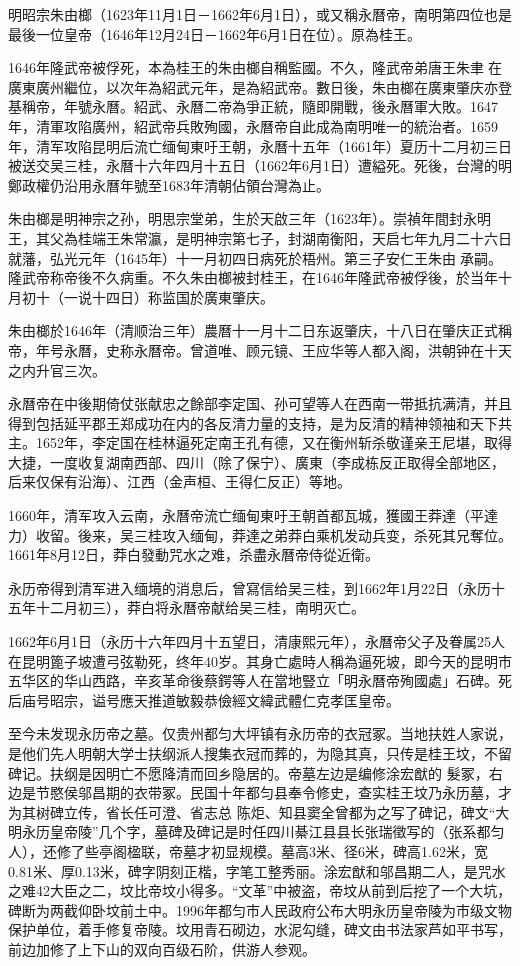 明昭宗朱由榔（1623年11月1日－1662年6月1日），或又稱永曆帝，南明第四位也是最後一位皇帝（1646年12月24日－1662年6月1日在位）。原為桂王。

1646年隆武帝被俘死，本為桂王的朱由榔自稱監國。不久，隆武帝弟唐王朱聿𨮁在廣東廣州繼位，以次年為紹武元年，是為紹武帝。數日後，朱由榔在廣東肇庆亦登基稱帝，年號永曆。紹武、永曆二帝為爭正統，隨即開戰，後永曆軍大敗。1647年，清軍攻陷廣州，紹武帝兵敗殉國，永曆帝自此成為南明唯一的統治者。1659年，清军攻陷昆明后流亡缅甸東吁王朝，永曆十五年（1661年）夏历十二月初三日被送交吴三桂，永曆十六年四月十五日（1662年6月1日）遭縊死。死後，台灣的明鄭政權仍沿用永曆年號至1683年清朝佔領台灣為止。

朱由榔是明神宗之孙，明思宗堂弟，生於天啟三年（1623年）。崇禎年間封永明王，其父為桂端王朱常瀛，是明神宗第七子，封湖南衡阳，天启七年九月二十六日就藩，弘光元年（1645年）十一月初四日病死於梧州。第三子安仁王朱由𣜬承嗣。隆武帝称帝後不久病重。不久朱由榔被封桂王，在1646年隆武帝被俘後，於当年十月初十（一说十四日）称监国於廣東肇庆。

朱由榔於1646年（清顺治三年）農曆十一月十二日东返肇庆，十八日在肇庆正式稱帝，年号永曆，史称永曆帝。曾道唯、顾元镜、王应华等人都入阁，洪朝钟在十天之内升官三次。

永曆帝在中後期倚仗张献忠之餘部李定国、孙可望等人在西南一带抵抗满清，并且得到包括延平郡王郑成功在内的各反清力量的支持，是为反清的精神领袖和天下共主。1652年，李定国在桂林逼死定南王孔有德，又在衡州斩杀敬谨亲王尼堪，取得大捷，一度收复湖南西部、四川（除了保宁）、廣東（李成栋反正取得全部地区，后来仅保有沿海）、江西（金声桓、王得仁反正）等地。

1660年，清军攻入云南，永曆帝流亡缅甸東吁王朝首都瓦城，獲國王莽達（平達力）收留。後来，吴三桂攻入缅甸，莽達之弟莽白乘机发动兵变，杀死其兄奪位。1661年8月12日，莽白發動咒水之难，杀盡永曆帝侍從近衛。

永历帝得到清军进入缅境的消息后，曾寫信给吴三桂，到1662年1月22日（永历十五年十二月初三），莽白将永曆帝献给吴三桂，南明灭亡。

1662年6月1日（永历十六年四月十五望日，清康熙元年），永曆帝父子及眷属25人在昆明篦子坡遭弓弦勒死，终年40岁。其身亡處時人稱為逼死坡，即今天的昆明市五华区的华山西路，辛亥革命後蔡鍔等人在當地豎立「明永曆帝殉國處」石碑。死后庙号昭宗，谥号應天推道敏毅恭儉經文緯武體仁克孝匡皇帝。

至今未发现永历帝之墓。仅贵州都匀大坪镇有永历帝的衣冠冢。当地扶姓人家说，是他们先人明朝大学士扶纲派人搜集衣冠而葬的，为隐其真，只传是桂王坟，不留碑记。扶纲是因明亡不愿降清而回乡隐居的。帝墓左边是编修涂宏猷的 髮冢，右边是节愍侯邬昌期的衣带冢。民国十年都匀县奉令修史，查实桂王坟乃永历墓，才为其树碑立传，省长任可澄、省志总 陈炬、知县窦全曾都为之写了碑记，碑文“大明永历皇帝陵”几个字，墓碑及碑记是时任四川綦江县县长张瑞徵写的（张系都匀人），还修了些亭阁楹联，帝墓才初显规模。墓高3米、径6米，碑高1.62米，宽0.81米、厚0.13米，碑字阴刻正楷，字笔工整秀丽。涂宏猷和邬昌期二人，是咒水之难42大臣之二，坟比帝坟小得多。“文革”中被盗，帝坟从前到后挖了一个大坑，碑断为两截仰卧坟前土中。1996年都匀市人民政府公布大明永历皇帝陵为市级文物保护单位，着手修复帝陵。坟用青石砌边，水泥勾缝，碑文由书法家芦如平书写，前边加修了上下山的双向百级石阶，供游人参观。

